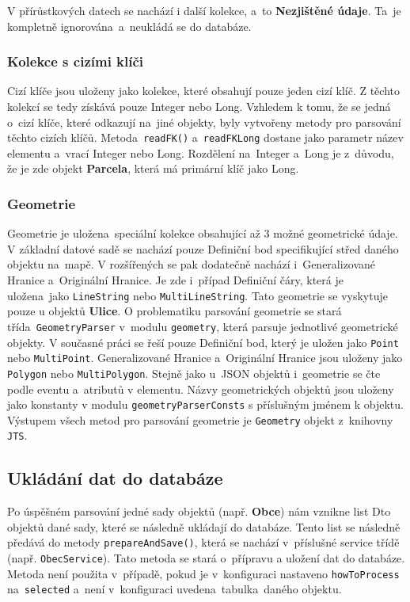 V přírůstkových datech se nachází i další kolekce, a~to \textbf{Nezjištěné údaje}.
Ta~je kompletně ignorována~a~neukládá se do databáze.

\subsubsection*{Kolekce s cizími klíči}
Cizí klíče jsou uloženy jako kolekce, které obsahují pouze jeden cizí klíč.
Z těchto kolekcí se tedy získává pouze Integer nebo Long.
Vzhledem k tomu, že se jedná o~cizí klíče, které odkazují na~jiné objekty,
byly vytvořeny metody pro parsování těchto cizích klíčů.
Metoda~\texttt{readFK()} a~\texttt{readFKLong} dostane jako parametr název elementu a~vrací Integer nebo Long.
Rozdělení na~Integer a~Long je z~důvodu, že je zde objekt \textbf{Parcela}, která má primární klíč jako Long.

\subsubsection*{Geometrie}
Geometrie je uložena~speciální kolekce obsahující až 3 možné geometrické údaje.
V základní datové sadě se nachází pouze Definiční bod specifikující střed daného objektu na~mapě.
V rozšířených se pak dodatečně nachází i~Generalizované Hranice a~Originální Hranice.
Je zde i~případ Definiční čáry, která je uložena~jako \texttt{LineString} nebo \texttt{MultiLineString}.
Tato geometrie se vyskytuje pouze u objektů \textbf{Ulice}.
O problematiku parsování geometrie se stará třída~\texttt{GeometryParser} v~modulu \texttt{geometry}, která parsuje jednotlivé geometrické objekty.
V současné práci se řeší pouze Definiční bod, který je uložen jako \texttt{Point} nebo \texttt{MultiPoint}.
Generalizované Hranice a~Originální Hranice jsou uloženy jako \texttt{Polygon} nebo \texttt{MultiPolygon}.
Stejně jako u~JSON objektů i~geometrie se čte podle eventu a~atributů v elementu.
Názvy geometrických objektů jsou uloženy jako konstanty v modulu \texttt{geometryParserConsts} s příslušným jménem k objektu.
Výstupem všech metod pro parsování geometrie je \texttt{Geometry} objekt z~knihovny \texttt{JTS}.

\subsection{Ukládání dat do databáze}
Po úspěšném parsování jedné sady objektů (např. \textbf{Obce}) nám vznikne list Dto objektů
dané sady, které se následně ukládají do databáze. Tento list se následně předává do metody \texttt{prepareAndSave()},
která se nachází v~příslušné service třídě (např. \texttt{ObecService}).
Tato metoda se stará o~přípravu a uložení dat do databáze.
Metoda není použita v~případě, pokud je v~konfiguraci nastaveno \texttt{howToProcess} \\ na~\texttt{selected}
a~není v~konfiguraci uvedena~tabulka~daného objektu.

